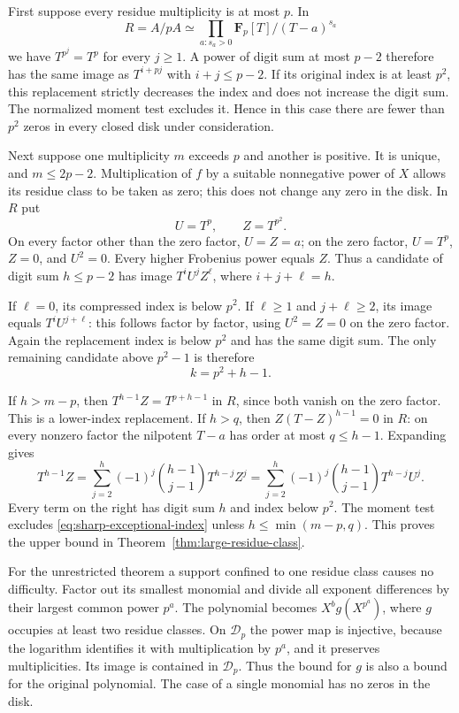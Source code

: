 First suppose every residue multiplicity is at most $p$.  In
\[
 R=A/pA\simeq\prod_{a:s_a>0}\mathbf F_p[T]/(T-a)^{s_a}
\]
we have $T^{p^j}=T^p$ for every $j\ge1$.  A power of digit sum at most
$p-2$ therefore has the same image as $T^{i+pj}$ with
$i+j\le p-2$.  If its original index is at least $p^2$, this replacement
strictly decreases the index and does not increase the digit sum.
The normalized moment test excludes it.  Hence in this case there are
fewer than $p^2$ zeros in every closed disk under consideration.

Next suppose one multiplicity $m$ exceeds $p$ and another is positive.
It is unique, and $m\le2p-2$.  Multiplication of $f$ by a suitable
nonnegative power of $X$ allows its residue class to be taken as zero;
this does not change any zero in the disk.  In $R$ put
\[
                  U=T^p,\qquad Z=T^{p^2}.
\]
On every factor other than the zero factor, $U=Z=a$; on the zero factor,
$U=T^p$, $Z=0$, and $U^2=0$.  Every higher Frobenius power equals $Z$.
Thus a candidate of digit sum $h\le p-2$ has image
$T^iU^jZ^\ell$, where $i+j+\ell=h$.

If $\ell=0$, its compressed index is below $p^2$.  If
$\ell\ge1$ and $j+\ell\ge2$, its image equals
$T^iU^{j+\ell}$: this follows factor by factor, using $U^2=Z=0$
on the zero factor.  Again the replacement index is below $p^2$ and
has the same digit sum.  The only remaining candidate above $p^2-1$
is therefore
\begin{equation}\label{eq:sharp-exceptional-index}
                        k=p^2+h-1.
\end{equation}

If $h>m-p$, then $T^{h-1}Z=T^{p+h-1}$ in $R$, since both vanish on
the zero factor.  This is a lower-index replacement.  If $h>q$, then
$Z(T-Z)^{h-1}=0$ in $R$: on every nonzero factor the nilpotent
$T-a$ has order at most $q\le h-1$.  Expanding gives
\[
 T^{h-1}Z
   =\sum_{j=2}^{h}(-1)^j\binom{h-1}{j-1}T^{h-j}Z^j
   =\sum_{j=2}^{h}(-1)^j\binom{h-1}{j-1}T^{h-j}U^j.
\]
Every term on the right has digit sum $h$ and index below $p^2$.
The moment test excludes \eqref{eq:sharp-exceptional-index} unless
$h\le\min(m-p,q)$.  This proves the upper bound in
Theorem~\ref{thm:large-residue-class}.

For the unrestricted theorem a support confined to one residue class
causes no difficulty.  Factor out its smallest monomial and divide all
exponent differences by their largest common power $p^a$.  The
polynomial becomes $X^b g(X^{p^a})$, where $g$ occupies at least two
residue classes.  On $\mathcal D_p$ the power map is injective, because
the logarithm identifies it with multiplication by $p^a$, and it
preserves multiplicities.  Its image is contained in $\mathcal D_p$.
Thus the bound for $g$ is also a bound for the original polynomial.
The case of a single monomial has no zeros in the disk.

